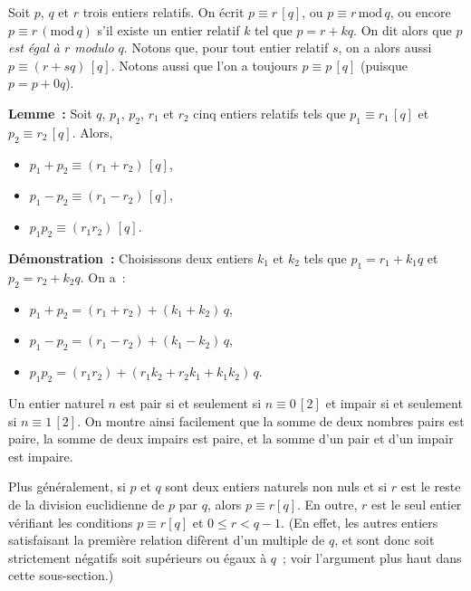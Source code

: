 Soit $p$, $q$ et $r$ trois entiers relatifs. 
On écrit $p \equiv r \, [q]$, ou $p \equiv r \, \mathrm{mod} \, q$, ou encore $p \equiv r \, ( \mathrm{mod} \, q)$ s'il existe un entier relatif $k$ tel que $p = r + k q$.  
On dit alors que \textit{$p$ est égal à $r$ modulo $q$}.
Notons que, pour tout entier relatif $s$, on a alors aussi $p \equiv (r + s q) \, [q]$.
Notons aussi que l'on a toujours $p \equiv p \, [q]$ (puisque $p = p + 0 q$). 

\medskip 

\noindent\textbf{Lemme :} Soit $q$, $p_1$, $p_2$, $r_1$ et $r_2$ cinq entiers relatifs tels que $p_1 \equiv r_1 \, [q]$ et $p_2 \equiv r_2 \, [q]$.
Alors, 
\begin{itemize}[nosep]
    \item $p_1 + p_2 \equiv (r_1 + r_2) \, [q]$, 
    \item $p_1 - p_2 \equiv (r_1 - r_2) \, [q]$, 
    \item $p_1 p_2 \equiv (r_1 r_2) \, [q]$.
\end{itemize}

\medskip

\noindent\textbf{Démonstration :} Choisissons deux entiers $k_1$ et $k_2$ tels que $p_1 = r_1 + k_1 q$ et $p_2 = r_2 + k_2 q$. 
On a :
\begin{itemize}[nosep]
    \item $p_1 + p_2 = (r_1 + r_2) + (k_1 + k_2) \, q$, 
    \item $p_1 - p_2 = (r_1 - r_2) + (k_1 - k_2) \, q$, 
    \item $p_1 p_2 = (r_1 r_2) + (r_1 k_2 + r_2 k_1 + k_1 k_2) \, q$.
\end{itemize}

\done

\bigskip

Un entier naturel $n$ est pair si et seulement si $n \equiv 0 \, [2]$ et impair si et seulement si $n \equiv 1 \, [2]$. 
On montre ainsi facilement que la somme de deux nombres pairs est paire, la somme de deux impairs est paire, et la somme d'un pair et d'un impair est impaire.

Plus généralement, si $p$ et $q$ sont deux entiers naturels non nuls et si $r$ est le reste de la division euclidienne de $p$ par $q$, alors $p \equiv r [q]$. 
En outre, $r$ est le seul entier vérifiant les conditions $p \equiv r [q]$ et $0 \leq r < q-1$. 
(En effet, les autres entiers satisfaisant la première relation difèrent d'un multiple de $q$, et sont donc soit strictement négatifs soit supérieurs ou égaux à $q$ ; voir l'argument plus haut dans cette sous-section.)

